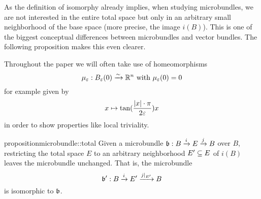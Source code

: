 \begin{myparagraph}
    As the definition of isomorphy already implies, when studying microbundles,
    we are not interested in the entire total space
    but only in an arbitrary small neighborhood of the base space (more precise, the image $i(B)$).
    This is one of the biggest conceptual differences between
    microbundles and vector bundles.
    The following proposition makes this even clearer.
    
    Throughout the paper we will often take use of homeomorphisms
    \[ \mu_\eps: \ball[\eps] \isomto \R^n \twith \mu_\eps(0) = 0 \]
    for example given by
    \[ x \mapsto \tan(\frac{\vert{} x \vert{}\cdot\pi}{2\varepsilon{}}) x \]
    in order to show properties like local triviality.
\end{myparagraph}

\begin{mystatement}{proposition}{microbundle::total}
    Given a microbundle $\bundledef{\bb}{B}{E}{i}{j}$ over $B$,
    restricting the total space $E$ to an
    arbitrary neighborhood $E' \subseteq{} E$ of $i(B)$ leaves the microbundle unchanged.
    That is, the microbundle
    \[ \bundledef{\bb'}{B}{E'}{i}{j\restr{E'}} \]
    is isomorphic to $\bb$.
\end{mystatement}

